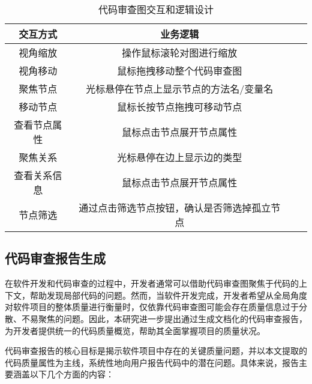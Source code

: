 \begin{table}[htbp]
\caption{代码审查图交互和逻辑设计}
\vspace{0.5em}\centering\wuhao
\begin{tabular}{cccc}
\toprule
交互方式 & 业务逻辑 \\
\midrule
视角缩放 & 操作鼠标滚轮对图进行缩放  \\
视角移动 & 鼠标拖拽移动整个代码审查图   \\
聚焦节点 & 光标悬停在节点上显示节点的方法名/变量名  \\
移动节点 & 鼠标长按节点拖拽可移动节点 \\
查看节点属性 & 鼠标点击节点展开节点属性  \\
聚焦关系 & 光标悬停在边上显示边的类型  \\
查看关系信息 & 鼠标点击节点展开节点属性  \\
节点筛选 & 通过点击筛选节点按钮，确认是否筛选掉孤立节点 \\
\bottomrule
\end{tabular}
\end{table}



\subsection{代码审查报告生成}

在软件开发和代码审查的过程中，开发者通常可以借助代码审查图聚焦于代码的上下文，帮助发现局部代码的问题。然而，当软件开发完成，开发者希望从全局角度对软件项目的整体质量进行衡量时，仅依靠代码审查图可能会存在质量信息过于分散、不易聚焦的问题。因此，本研究进一步提出通过生成文档化的代码审查报告，为开发者提供统一的代码质量概览，帮助其全面掌握项目的质量状况。

代码审查报告的核心目标是揭示软件项目中存在的关键质量问题，并以本文提取的代码质量属性为主线，系统性地向用户报告代码中的潜在问题。具体来说，报告主要涵盖以下几个方面的内容：

